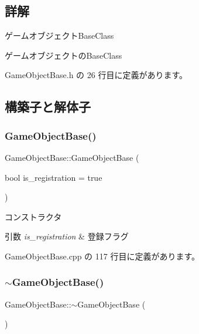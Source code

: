 \subsection{詳解}
ゲームオブジェクト\+Base\+Class 

ゲームオブジェクトの\+Base\+Class 

 Game\+Object\+Base.\+h の 26 行目に定義があります。



\subsection{構築子と解体子}
\mbox{\label{class_game_object_base_a4682a3e88a45a462de288f14e9a8545d}} 
\subsubsection{\texorpdfstring{Game\+Object\+Base()}{GameObjectBase()}}
{\footnotesize\ttfamily Game\+Object\+Base\+::\+Game\+Object\+Base (\begin{DoxyParamCaption}\item[{bool}]{is\+\_\+registration = {\ttfamily true} }\end{DoxyParamCaption})}



コンストラクタ 


\begin{DoxyParams}{引数}
{\em is\+\_\+registration} & 登録フラグ \\
\hline
\end{DoxyParams}


 Game\+Object\+Base.\+cpp の 117 行目に定義があります。

\mbox{\label{class_game_object_base_a0cb813d5c7af673a3d190eb1b2d26275}} 
\subsubsection{\texorpdfstring{$\sim$\+Game\+Object\+Base()}{~GameObjectBase()}}
{\footnotesize\ttfamily Game\+Object\+Base\+::$\sim$\+Game\+Object\+Base (\begin{DoxyParamCaption}{ }\end{DoxyParamCaption})\hspace{0.3cm}{\ttfamily [virtual]}}



